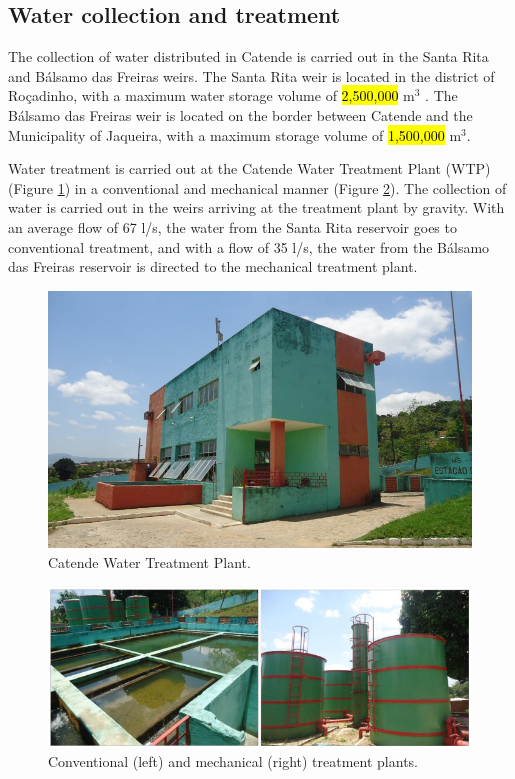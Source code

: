 \documentclass{singlecol}
\theoremstyle{TH}{
\newtheorem{lemma}{Lemma}
\newtheorem{theorem}[lemma]{Theorem}
\newtheorem{corrolary}[lemma]{Corrolary}
\newtheorem{conjecture}[lemma]{Conjecture}
\newtheorem{proposition}[lemma]{Proposition}
\newtheorem{claim}[lemma]{Claim}
\newtheorem{stheorem}[lemma]{Wrong Theorem}
\newtheorem{algorithm}{Algorithm}
}
\theoremstyle{THrm}{
\newtheorem{definition}{Definition}[section]
\newtheorem{question}{Question}[section]
\newtheorem{remark}{Remark}
\newtheorem{scheme}{Scheme}
}
\theoremstyle{THhit}{
\newtheorem{case}{Case}[section]
}
\begin{document}
\subsection{Water collection and treatment}

The collection of water distributed in Catende is carried out in the Santa Rita and Bálsamo das Freiras weirs. The Santa Rita weir is located in the district of Roçadinho, with a maximum water storage volume of \hl{2,500,000} m$^3$ . The Bálsamo das Freiras weir is located on the border between Catende and the Municipality of Jaqueira, with a maximum storage volume of \hl{1,500,000} m$^3$.

Water treatment is carried out at the Catende Water Treatment Plant (WTP) (Figure \ref{fig:WTP}) in a conventional and mechanical manner (Figure \ref{fig:WTPConvMec}). The collection of water is carried out in the weirs arriving at the treatment plant by gravity. With an average flow of 67 l/s, the water from the Santa Rita reservoir goes to conventional treatment, and with a flow of 35 l/s, the water from the Bálsamo das Freiras reservoir is directed to the mechanical treatment plant. 

\begin{figure}[h]
\caption{Catende Water Treatment Plant.}
\label{fig:WTP}
\centering
\includegraphics[width=\textwidth]{figures/ETACatende.png}
\end{figure}


\begin{figure}[h]
\caption{Conventional (left) and mechanical (right) treatment plants.}
\label{fig:WTPConvMec}
\centering
\includegraphics[width=\textwidth]{figures/ETAConvMec.png}
\end{figure}
\end{document}
